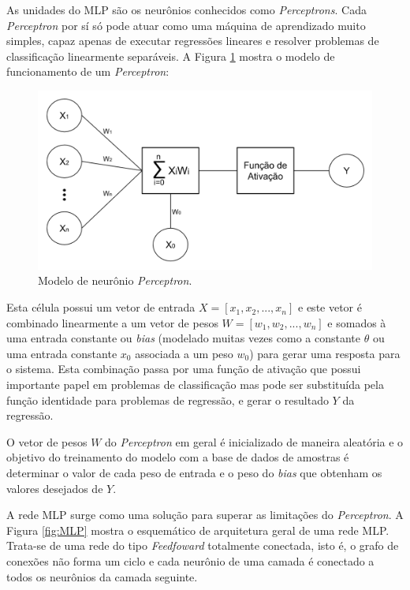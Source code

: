 \documentclass[12pt]{article}
\begin{document}
            As unidades do MLP são os neurônios conhecidos como \textit{Perceptrons}. Cada \textit{Perceptron} por sí só pode atuar como uma máquina de aprendizado muito simples, capaz apenas de executar regressões lineares e resolver problemas de classificação linearmente separáveis. A Figura \ref{fig:perceptron} mostra o modelo de funcionamento de um \textit{Perceptron}:
            
            \begin{figure}[H]
            \centering
            \includegraphics[width=14cm]{images/perceptron.png}\par
            \caption{Modelo de neurônio \textit{Perceptron}.}
            \label{fig:perceptron}
            \end{figure}
            
            Esta célula possui um vetor de entrada $X = [x_1, x_2, ..., x_n]$ e este vetor é combinado linearmente a um vetor de pesos $W = [w_1, w_2, ..., w_n]$ e somados à uma entrada constante ou \textit{bias} (modelado muitas vezes como a constante $\theta$ ou uma entrada constante $x_0$ associada a um peso $w_0$) para gerar uma resposta para o sistema. Esta combinação passa por uma função de ativação que possui importante papel em problemas de classificação mas pode ser substituída pela função identidade para problemas de regressão, e gerar o resultado $Y$ da regressão. 
            
            O vetor de pesos $W$ do \textit{Perceptron} em geral é inicializado de maneira aleatória e o objetivo do treinamento do modelo com a base de dados de amostras é determinar o valor de cada peso de entrada e o peso do \textit{bias} que obtenham os valores desejados de $Y$.
            
            A rede MLP surge como uma solução para superar as limitações do \textit{Perceptron}. A Figura \ref{fig:MLP} mostra o esquemático de arquitetura geral de uma rede MLP. Trata-se de uma rede do tipo \textit{Feedfoward} totalmente conectada, isto é, o grafo de conexões não forma um ciclo e cada neurônio de uma camada é conectado a todos os neurônios da camada seguinte. 
            
\end{document}
